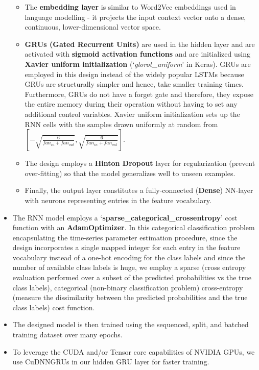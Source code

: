 \documentclass{article}
\begin{document}
\begin{itemize}
    \begin{itemize}
        \item The \textbf{embedding layer} is similar to Word2Vec embeddings used in language modelling - it projects the input context vector onto a dense, continuous, lower-dimensional vector space.
        \item \textbf{GRUs (Gated Recurrent Units)} are used in the hidden layer and are activated with \textbf{sigmoid activation functions} and are initialized using \textbf{Xavier uniform initialization} (`\textit{glorot\_uniform}' in Keras). GRUs are employed in this design instead of the widely popular LSTMs because GRUs are structurally simpler and hence, take smaller training times. Furthermore, GRUs do not have a forget gate and therefore, they expose the entire memory during their operation without having to set any additional control variables. Xavier uniform initialization sets up the RNN cells with the samples drawn uniformly at random from $[-\sqrt{\frac{6}{fan_{in} + fan_{out}}}, \sqrt{\frac{6}{fan_{in} + fan_{out}}}]$.
        \item The design employs a \textbf{Hinton Dropout} layer for regularization (prevent over-fitting) so that the model generalizes well to unseen examples.
        \item Finally, the output layer constitutes a fully-connected (\textbf{Dense}) NN-layer with neurons representing entries in the feature vocabulary.
    \end{itemize}
    \item The RNN model employs a `\textbf{sparse\_categorical\_crossentropy}' cost function with an \textbf{AdamOptimizer}. In this categorical classification problem encapsulating the time-series parameter estimation procedure, since the design incorporates a single mapped integer for each entry in the feature vocabulary instead of a one-hot encoding for the class labels and since the number of available class labels is huge, we employ a sparse (cross entropy evaluation performed over a subset of the predicted probabilities vs the true class labels), categorical (non-binary classification problem) cross-entropy (measure the dissimilarity between the predicted probabilities and the true class labels) cost function.
    \item The designed model is then trained using the sequenced, split, and batched training dataset over many epochs.
    \item To leverage the CUDA and/or Tensor core capabilities of NVIDIA GPUs, we use CuDNNGRUs in our hidden GRU layer for faster training.

\end{itemize}
\end{document}
